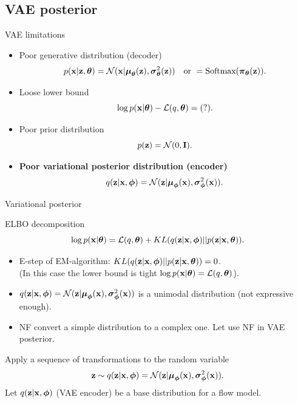 \subsection{VAE posterior}
\begin{frame}{VAE limitations}
	\begin{itemize}
		\item Poor generative distribution (decoder)
		\[
		p(\mathbf{x} | \mathbf{z}, \boldsymbol{\theta}) = \mathcal{N}(\mathbf{x}| \boldsymbol{\mu}_{\boldsymbol{\theta}}(\mathbf{z}), \boldsymbol{\sigma}^2_{\boldsymbol{\theta}}(\mathbf{z})) \quad \text{or } = \text{Softmax}(\boldsymbol{\pi}_{\boldsymbol{\theta}}(\mathbf{z})).
		\]
		\item Loose lower bound
		\[
		\log p(\mathbf{x} | \boldsymbol{\theta}) - \mathcal{L}(q, \boldsymbol{\theta}) = (?).
		\]
		\item Poor prior distribution
		\[
		p(\mathbf{z}) = \mathcal{N}(0, \mathbf{I}).
		\]
		\item \textbf{Poor variational posterior distribution (encoder)}
		\[
		q(\mathbf{z} | \mathbf{x}, \boldsymbol{\phi}) = \mathcal{N}(\mathbf{z}| \boldsymbol{\mu}_{\boldsymbol{\phi}}(\mathbf{x}), \boldsymbol{\sigma}^2_{\boldsymbol{\phi}}(\mathbf{x})).
		\]
	\end{itemize}
\end{frame}
\begin{frame}{Variational posterior}
	\begin{block}{ELBO decomposition}
		\[
		\log p(\mathbf{x} | \boldsymbol{\theta}) = \mathcal{L}(q, \boldsymbol{\theta}) + KL(q(\mathbf{z} | \mathbf{x}, \boldsymbol{\phi}) || p(\mathbf{z} | \mathbf{x}, \boldsymbol{\theta})).
		\]
	\end{block}
	\begin{itemize}
		\item E-step of EM-algorithm: $KL(q(\mathbf{z} | \mathbf{x}, \boldsymbol{\phi}) || p(\mathbf{z} | \mathbf{x}, \boldsymbol{\theta})) = 0$. \\
		(In this case the lower bound is tight $\log p(\mathbf{x} | \boldsymbol{\theta}) = \mathcal{L}(q, \boldsymbol{\theta})$). \\
		\item $q(\mathbf{z} | \mathbf{x}, \boldsymbol{\phi}) = \mathcal{N}(\mathbf{z}| \boldsymbol{\mu}_{\boldsymbol{\phi}}(\mathbf{x}), \boldsymbol{\sigma}^2_{\boldsymbol{\phi}}(\mathbf{x}))$ is a unimodal distribution (not expressive enough). \\
		\item NF convert a simple distribution to a complex one. Let use NF in VAE posterior.
	\end{itemize}
	Apply a sequence of transformations to the random variable
	\[
		\mathbf{z} \sim q(\mathbf{z} | \mathbf{x}, \boldsymbol{\phi}) = \mathcal{N}(\mathbf{z}| \boldsymbol{\mu}_{\boldsymbol{\phi}}(\mathbf{x}), \boldsymbol{\sigma}^2_{\boldsymbol{\phi}}(\mathbf{x})).
	\]
	Let $q(\mathbf{z} | \mathbf{x}, \boldsymbol{\phi})$ (VAE encoder) be a base distribution for a flow model.
\end{frame}
